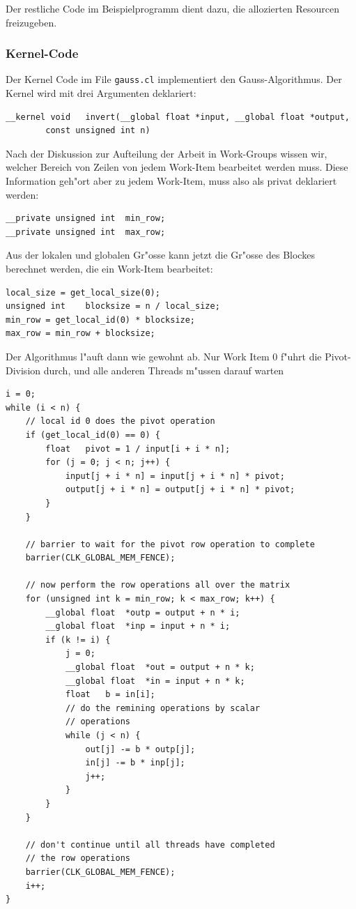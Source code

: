 Der restliche Code im Beispielprogramm dient dazu, die allozierten
Resourcen freizugeben.

\subsubsection{Kernel-Code}
Der Kernel Code im File \verb+gauss.cl+ implementiert den Gauss-Algorithmus.
Der Kernel wird mit drei Argumenten deklariert:
\begin{verbatim}
__kernel void   invert(__global float *input, __global float *output,
        const unsigned int n)
\end{verbatim}
Nach der Diskussion zur Aufteilung der Arbeit in Work-Groups wissen wir,
welcher Bereich von Zeilen von jedem Work-Item bearbeitet werden muss.
Diese Information geh"ort aber zu jedem Work-Item, muss also als 
privat deklariert werden:
\begin{verbatim}
__private unsigned int  min_row;
__private unsigned int  max_row;
\end{verbatim}
Aus der lokalen und globalen Gr"osse kann jetzt die Gr"osse des Blockes
berechnet werden, die ein Work-Item bearbeitet:
\begin{verbatim}
local_size = get_local_size(0);
unsigned int    blocksize = n / local_size;
min_row = get_local_id(0) * blocksize;
max_row = min_row + blocksize;
\end{verbatim}
Der Algorithmus l"auft dann wie gewohnt ab.
Nur Work Item 0 f"uhrt die Pivot-Division durch, und alle anderen
Threads m"ussen darauf warten
\begin{verbatim}
i = 0;
while (i < n) {
    // local id 0 does the pivot operation
    if (get_local_id(0) == 0) {
        float   pivot = 1 / input[i + i * n];
        for (j = 0; j < n; j++) {
            input[j + i * n] = input[j + i * n] * pivot;
            output[j + i * n] = output[j + i * n] * pivot;
        }
    }

    // barrier to wait for the pivot row operation to complete
    barrier(CLK_GLOBAL_MEM_FENCE);

    // now perform the row operations all over the matrix
    for (unsigned int k = min_row; k < max_row; k++) {
        __global float  *outp = output + n * i;
        __global float  *inp = input + n * i;
        if (k != i) {
            j = 0; 
            __global float  *out = output + n * k;
            __global float  *in = input + n * k;
            float   b = in[i];
            // do the remining operations by scalar
            // operations
            while (j < n) {
                out[j] -= b * outp[j];
                in[j] -= b * inp[j];
                j++;
            }
        }
    }

    // don't continue until all threads have completed
    // the row operations
    barrier(CLK_GLOBAL_MEM_FENCE);
    i++;
}
\end{verbatim}

